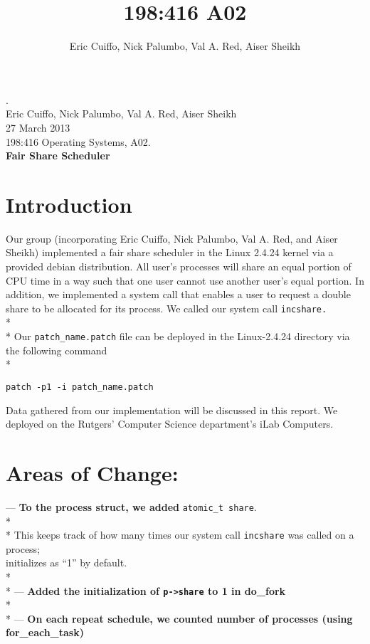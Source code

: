 \documentclass[10pt]{article}
\begin{document}
\title{198:416 A02}
\author{Eric Cuiffo, Nick Palumbo, Val A. Red, Aiser Sheikh}

\fancyhead{}
.\\
Eric Cuiffo, Nick Palumbo, Val A. Red, Aiser Sheikh\\
27 March 2013 \\
198:416 Operating Systems, A02. \\
{\bfseries Fair Share Scheduler}

\section{Introduction}

Our group (incorporating Eric Cuiffo, Nick Palumbo, Val A. Red, and Aiser Sheikh) implemented a fair 
share scheduler in the Linux 2.4.24 kernel via a provided debian distribution. 
All user's processes will share an equal portion of CPU time in a way such that one
user cannot use another user's equal portion. In addition, we implemented a system call
that enables a user to request a double share to be allocated for its process. We called
our system call \texttt{incshare.} \\* \\*
\hspace*{36pt} Our \texttt{patch\_name.patch} file can be deployed in the Linux-2.4.24 directory via the following command \\*
\begin{verbatim}
patch -p1 -i patch_name.patch
\end{verbatim}

Data gathered from our implementation will be discussed in this report. We deployed on the
Rutgers' Computer Science department's iLab Computers. 

\section{Areas of Change:}
--- {\bfseries To the process struct, we added} \texttt{atomic\_t share}. \\* \\*
\hspace*{36pt} This keeps track of how many times our system call \texttt{incshare} was
called on a process; \\ 
\hspace*{36pt} initializes as ``1'' by default. \\* \\* 
--- {\bfseries Added the initialization of \texttt{p-\textgreater share} to 1 in do\_fork} \\* \\*
--- {\bfseries On each repeat schedule, we counted number of processes (using for\_each\_task)}
\end{document}
